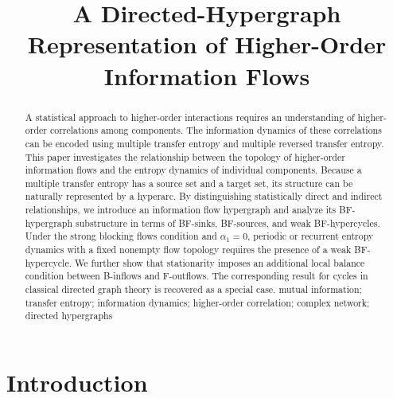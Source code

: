 \documentclass{comnet}%
\begin{document}
\title{A Directed-Hypergraph Representation of Higher-Order Information Flows}


\author{%
\address{Independent Researcher, Seoul, Republic of Korea}}

\maketitle

\begin{abstract}
{A statistical approach to higher-order interactions requires an understanding of higher-order correlations among components. The information dynamics of these correlations can be encoded using multiple transfer entropy and multiple reversed transfer entropy. This paper investigates the relationship between the topology of higher-order information flows and the entropy dynamics of individual components. Because a multiple transfer entropy has a source set and a target set, its structure can be naturally represented by a hyperarc. By distinguishing statistically direct and indirect relationships, we introduce an information flow hypergraph and analyze its BF-hypergraph substructure in terms of BF-sinks, BF-sources, and weak BF-hypercycles. Under the strong blocking flows condition and $\alpha_{1} = 0$, periodic or recurrent entropy dynamics with a fixed nonempty flow topology requires the presence of a weak BF-hypercycle. We further show that stationarity imposes an additional local balance condition between B-inflows and F-outflows. The corresponding result for cycles in classical directed graph theory is recovered as a special case.}
{mutual information; transfer entropy; information dynamics; higher-order correlation; complex network; directed hypergraphs}
\end{abstract}


\section{\label{sec:Intro} Introduction}
\end{document}
